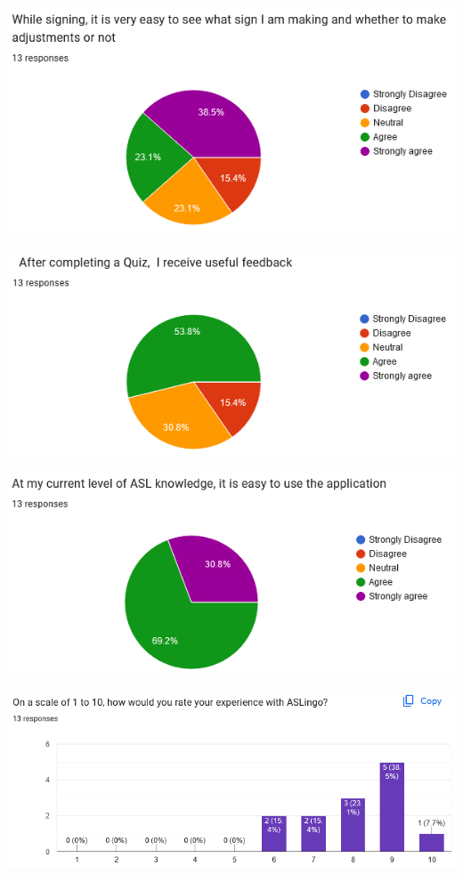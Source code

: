 \documentclass[12pt, titlepage]{article}
\begin{document}
\vspace{0.5cm}
\centering
\includegraphics[scale=0.8]{Usability Survey Results/Q5.png}

\vspace{0.5cm}
\centering
\includegraphics[scale=0.8]{Usability Survey Results/Q6.png}

\vspace{0.5cm}
\centering
\includegraphics[scale=0.8]{Usability Survey Results/Q7.png}

\vspace{0.5cm}
\centering
\includegraphics[scale=0.75]{Usability Survey Results/Q8.png}
\end{document}
